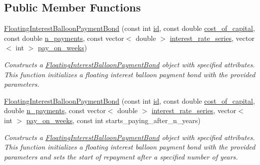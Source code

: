 \subsection*{Public Member Functions}
\begin{DoxyCompactItemize}
\item 
\mbox{\hyperlink{classFloatingInterestBalloonPaymentBond_aa42f50447a3dd1bd6959e8c4bd0c2421}{Floating\+Interest\+Balloon\+Payment\+Bond}} (const int \mbox{\hyperlink{classBond_a7f75bcafbc16676ad6dbafbf40afae4a}{id}}, const double \mbox{\hyperlink{classBond_ad98df7d28b398e620286f95ee085439b}{cost\+\_\+of\+\_\+capital}}, const double \mbox{\hyperlink{classBond_a4a227b6de2eeada118d82ab1633b1db8}{n\+\_\+payments}}, const vector$<$ double $>$ \mbox{\hyperlink{classFloatingInterestBalloonPaymentBond_a36c73466753c976e513c6763f79f58ad}{interest\+\_\+rate\+\_\+series}}, vector$<$ int $>$ \mbox{\hyperlink{classBond_ae8dd46fcbf95c993460ffe4ea1f52739}{pay\+\_\+on\+\_\+weeks}})
\begin{DoxyCompactList}\small\item\em Constructs a \mbox{\hyperlink{classFloatingInterestBalloonPaymentBond}{Floating\+Interest\+Balloon\+Payment\+Bond}} object with specified attributes. This function initializes a floating interest balloon payment bond with the provided parameters. \end{DoxyCompactList}\item 
\mbox{\hyperlink{classFloatingInterestBalloonPaymentBond_a9732cbf82ecc484237071bb681f7dc63}{Floating\+Interest\+Balloon\+Payment\+Bond}} (const int \mbox{\hyperlink{classBond_a7f75bcafbc16676ad6dbafbf40afae4a}{id}}, const double \mbox{\hyperlink{classBond_ad98df7d28b398e620286f95ee085439b}{cost\+\_\+of\+\_\+capital}}, double \mbox{\hyperlink{classBond_a4a227b6de2eeada118d82ab1633b1db8}{n\+\_\+payments}}, const vector$<$ double $>$ \mbox{\hyperlink{classFloatingInterestBalloonPaymentBond_a36c73466753c976e513c6763f79f58ad}{interest\+\_\+rate\+\_\+series}}, vector$<$ int $>$ \mbox{\hyperlink{classBond_ae8dd46fcbf95c993460ffe4ea1f52739}{pay\+\_\+on\+\_\+weeks}}, const int starts\+\_\+paying\+\_\+after\+\_\+n\+\_\+years)
\begin{DoxyCompactList}\small\item\em Constructs a \mbox{\hyperlink{classFloatingInterestBalloonPaymentBond}{Floating\+Interest\+Balloon\+Payment\+Bond}} object with specified attributes. This function initializes a floating interest balloon payment bond with the provided parameters and sets the start of repayment after a specified number of years. \end{DoxyCompactList}\item 

\end{DoxyCompactItemize}
